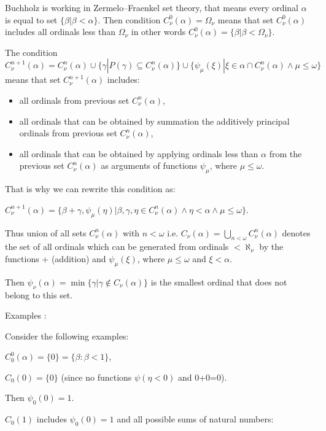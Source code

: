 \documentclass[10pt]{article}
\begin{document}
Buchholz is working in Zermelo–Fraenkel set theory, that means every ordinal \(\alpha\) is equal to set \(\{\beta|\beta<\alpha\}\). Then condition \(C_\nu^0(\alpha)=\Omega_\nu\) means that set \(C_\nu^0(\alpha)\) includes all ordinals less than \(\Omega_\nu\) in other words \(C_\nu^0(\alpha)=\{\beta|\beta<\Omega_\nu\}\).

The condition \(C_\nu^{n+1}(\alpha) = C_\nu^n(\alpha) \cup \{\gamma | P(\gamma) \subseteq C_\nu^n(\alpha)\} \cup \{\psi_\mu(\xi) | \xi \in \alpha \cap C_\nu^n(\alpha) \wedge \mu \leq \omega\}\) means that set \(C_\nu^{n+1}(\alpha)\) includes:

\begin{itemize}
     \setlength{\itemsep}{1pt}
     \setlength{\parskip}{0pt}
     \setlength{\parsep}{0pt}
\item all ordinals from previous set \(C_\nu^n(\alpha)\),
\item all ordinals that can be obtained by summation the additively principal ordinals from previous set \(C_\nu^n(\alpha)\),
\item all ordinals that can be obtained by applying ordinals less than \(\alpha\) from the previous set \(C_\nu^n(\alpha)\) as arguments of functions \(\psi_\mu\), where \(\mu\le\omega\).
\end{itemize}

That is why we can rewrite this condition as:

\(C_\nu^{n+1}(\alpha) = \{\beta+\gamma,\psi_\mu(\eta)|\beta, \gamma,\eta\in C_{\nu}^n(\alpha)\wedge\eta<\alpha \wedge \mu \leq \omega\}\).

Thus union of all sets \(C_\nu^n (\alpha)\) with \(n<\omega\) i.e. \(C_\nu(\alpha) = \bigcup_{n < \omega} C_\nu^n (\alpha)\) denotes the set of all ordinals which can be generated from ordinals \(<\aleph_\nu\) by the functions + (addition) and \(\psi_{\mu}(\xi)\), where \(\mu\le\omega\) and \(\xi<\alpha\).

Then \( \psi_\nu(\alpha) = \min\{\gamma | \gamma \not\in C_\nu(\alpha)\}\) is the smallest ordinal that does not belong to this set.

Examples :

Consider the following examples:

\(C_0^0(\alpha)=\{0\} =\{\beta:\beta<1\}\),

\(C_0(0)=\{0\}\) (since no functions \(\psi(\eta<0)\) and 0+0=0).

Then \(\psi_0(0)=1\).

\(C_0(1)\) includes \(\psi_0(0)=1\) and all possible sums of natural numbers:
\end{document}
